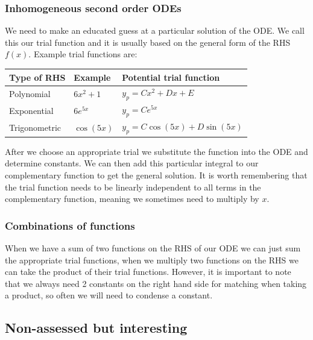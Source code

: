 \documentclass[12pt]{article}
\begin{document}
\subsubsection*{Inhomogeneous second order ODEs}
We need to make an educated guess at a particular solution of the ODE. We call this our trial function and it is usually based on the general form of the RHS \(f(x)\). Example trial functions are:
\begin{table}[H]
    \begin{tabular}{|l|l|l|}
    \hline
        \textbf{Type of RHS} & \textbf{Example} & \textbf{Potential trial function} \\ \hline
        Polynomial & \(6x^2+1\) & \(y_p=Cx^2+Dx+E\) \\ \hline
        Exponential & \(6e^{5x}\) & \(y_p=Ce^{5x}\) \\ \hline
        Trigonometric & \(\cos(5x)\) & \(y_p=C\cos(5x)+D\sin(5x)\) \\ \hline
    \end{tabular}
\end{table}
After we choose an appropriate trial we substitute the function into the ODE and determine constants. We can then add this particular integral to our complementary function to get the general solution. It is worth remembering that the trial function needs to be linearly independent to all terms in the complementary function, meaning we sometimes need to multiply by \(x\).
\subsubsection*{Combinations of functions}
When we have a sum of two functions on the RHS of our ODE we can just sum the appropriate trial functions, when we multiply two functions on the RHS we can take the product of their trial functions. However, it is important to note that we always need 2 constants on the right hand side for matching when taking a product, so often we will need to condense a constant.
\subsection*{Non-assessed but interesting}
\end{document}
